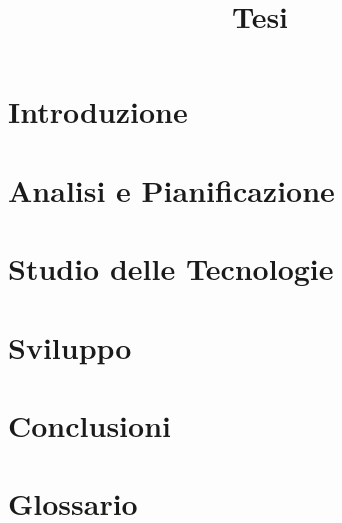 
\hypersetup{colorlinks=false}
\title{Tesi}


	
	\newpage
	
	\newpage
	
	\newpage
	\tableofcontents
	\listoffigures
	\listoftables
	\newpage
	\chapter{Introduzione}
	
	\newpage
	\chapter{Analisi e Pianificazione}
	
	\newpage
	\chapter{Studio delle Tecnologie}
	
	\newpage
	\chapter{Sviluppo}
	
	\newpage
	\chapter{Conclusioni}
	
	\newpage
	\appendix
	\chapter{Glossario}
	
	
   
